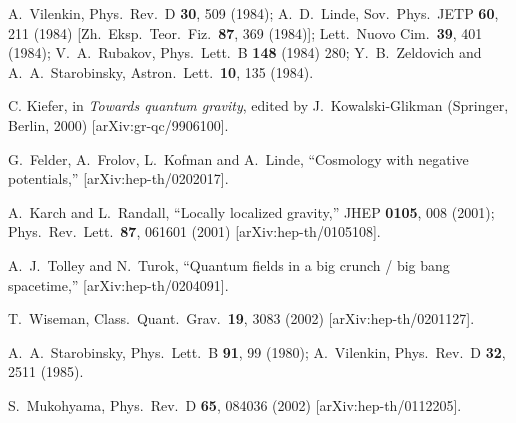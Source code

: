 \documentclass[a4paper,preprint,nofootinbib,
                 showpacs,preprintnumbers,amsmath,amssymb]{revtex4}
\begin{document}
\begin{thebibliography}{99}
A.~Vilenkin, 
Phys.\ Rev.\ D {\bf 30}, 509 (1984); 
A.~D.~Linde, 
Sov.\ Phys.\ JETP {\bf 60}, 211 (1984) 
[Zh.\ Eksp.\ Teor.\ Fiz.\  {\bf 87}, 369 (1984)]; 
Lett.\ Nuovo Cim.\  {\bf 39}, 401 (1984); 
V.~A.~Rubakov, 
Phys.\ Lett.\ B {\bf 148} (1984) 280; 
Y.~B.~Zeldovich and A.~A.~Starobinsky, 
Astron.\ Lett.\  {\bf 10}, 135 (1984). 
 
C. Kiefer, in {\em Towards quantum gravity}, edited by 
J.~Kowalski-Glikman (Springer, Berlin, 2000) [arXiv:gr-qc/9906100]. 
 
G.~Felder, A.~Frolov, L.~Kofman and A.~Linde, 
``Cosmology with negative potentials,'' 
[arXiv:hep-th/0202017]. 
 
A.~Karch and L.~Randall,  
``Locally localized gravity,'' JHEP {\bf 0105}, 008 (2001); 
Phys.\ Rev.\ Lett.\ {\bf 87}, 061601 (2001) [arXiv:hep-th/0105108]. 
 
A.~J.~Tolley and N.~Turok, 
``Quantum fields in a big crunch / big bang spacetime,'' 
[arXiv:hep-th/0204091]. 
 
T.~Wiseman, 
Class.\ Quant.\ Grav.\  {\bf 19}, 3083 (2002) 
[arXiv:hep-th/0201127]. 
 
A.~A.~Starobinsky, 
Phys.\ Lett.\ B {\bf 91}, 99 (1980); 
A.~Vilenkin, 
Phys.\ Rev.\ D {\bf 32}, 2511 (1985). 
 
S.~Mukohyama, 
Phys.\ Rev.\ D {\bf 65}, 084036 (2002) 
[arXiv:hep-th/0112205]. 
\end{thebibliography} 
\end{document}
